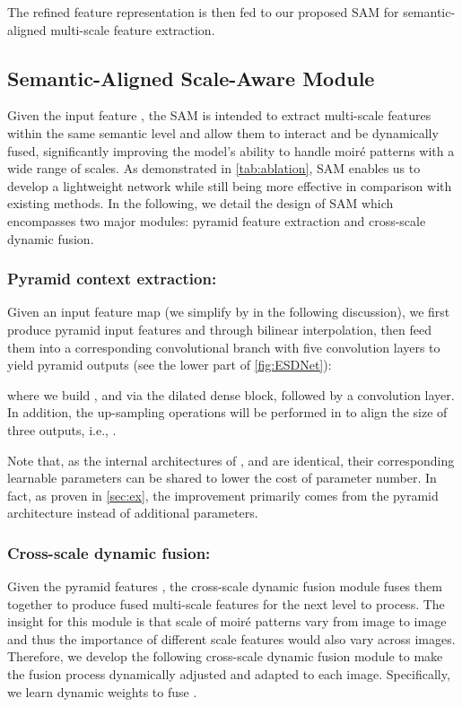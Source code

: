 \documentclass[runningheads]{llncs}
\newcommand{\ie}{i.e.}
\begin{document}
\noindent The refined feature representation  is then fed to our proposed SAM for semantic-aligned multi-scale feature extraction.


\subsection{Semantic-Aligned Scale-Aware Module}\label{sec:MCRB}
Given the input feature , the SAM is intended to extract multi-scale features within the same semantic level  and allow them to interact and be dynamically fused, significantly improving the model's ability to handle moiré patterns with a wide range of scales.
As demonstrated in \cref{tab:ablation}, SAM enables us to develop a lightweight network while still being more effective in comparison with existing methods. In the following, we detail the design of SAM which encompasses two major modules: pyramid feature extraction and cross-scale dynamic fusion.


\subsubsection{Pyramid context extraction:}
Given an input feature map  (we simplify  by  in the following discussion), we first produce pyramid input features  and  through bilinear interpolation, 
then feed them into a corresponding convolutional branch with five convolution layers to yield  pyramid outputs  (see the lower part of \cref{fig:ESDNet}):

where we build , and  via the dilated dense block, followed by a  convolution layer. In addition, the up-sampling operations will be  performed in  to align the size of three outputs, \ie, .

Note that, as the internal architectures of , and  are identical, their corresponding learnable parameters can be shared to lower the cost of parameter number. In fact, as proven in \cref{sec:ex}, the improvement primarily comes from the pyramid architecture instead of additional parameters.
 


\subsubsection{Cross-scale dynamic fusion:}
Given the pyramid features , the cross-scale dynamic fusion module fuses them together to produce fused multi-scale features for the next level to process. The insight for this module is that scale of moiré patterns vary from image to image and thus the importance of different scale features would also vary across images. Therefore, we develop the following cross-scale dynamic fusion module to make the fusion process dynamically adjusted and adapted to each image. Specifically, we learn dynamic weights to fuse .
\end{document}
